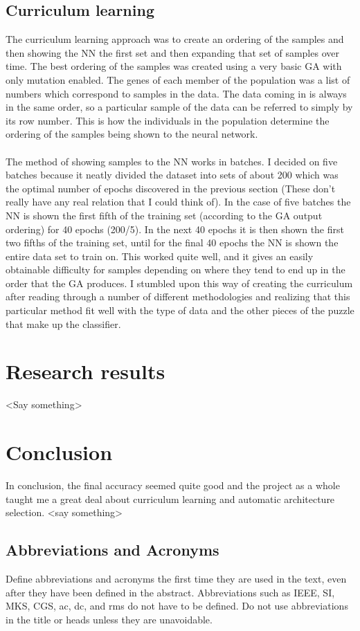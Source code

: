 \documentclass[conference]{IEEEtran}
\begin{document}
\subsection{Curriculum learning}
The curriculum learning approach was to create an ordering of the samples and then showing the NN the first set and then expanding that set of samples over time. The best ordering of the samples was created using a very basic GA with only mutation enabled. The genes of each member of the population was a list of numbers which correspond to samples in the data. The data coming in is always in the same order, so a particular sample of the data can be referred to simply by its row number. This is how the individuals in the population determine the ordering of the samples being shown to the neural network.
\\\\
The method of showing samples to the NN works in batches. I decided on five batches because it neatly divided the dataset into sets of about 200 which was the optimal number of epochs discovered in the previous section (These don't really have any real relation that I could think of). In the case of five batches the NN is shown the first fifth of the training set (according to the GA output ordering) for 40 epochs (200/5). In the next 40 epochs it is then shown the first two fifths of the training set, until for the final 40 epochs the NN is shown the entire data set to train on.
This worked quite well, and it gives an easily obtainable difficulty for samples depending on where they tend to end up in the order that the GA produces. I stumbled upon this way of creating the curriculum after reading through a number of different methodologies and realizing that this particular method fit well with the type of data and the other pieces of the puzzle that make up the classifier. 

\section{Research results}
<Say something>

\section{Conclusion}
In conclusion, the final accuracy seemed quite good and the project as a whole taught me a great deal about curriculum learning and automatic architecture selection.
<say something>

\subsection{Abbreviations and Acronyms}\label{AA}
Define abbreviations and acronyms the first time they are used in the text, 
even after they have been defined in the abstract. Abbreviations such as 
IEEE, SI, MKS, CGS, ac, dc, and rms do not have to be defined. Do not use 
abbreviations in the title or heads unless they are unavoidable.
\end{document}
